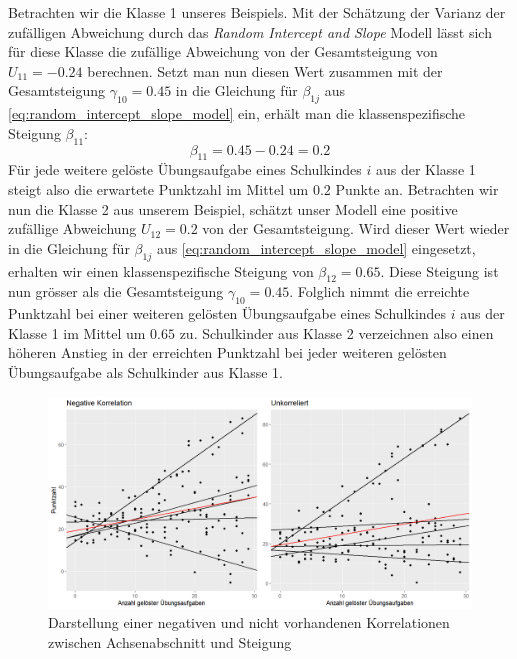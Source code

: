 \documentclass[12pt]{article}\usepackage[]{graphicx}\usepackage[]{color}
\begin{document}
Betrachten wir die Klasse 1 unseres Beispiels. Mit der Schätzung der Varianz der zufälligen Abweichung durch das \textit{Random Intercept and Slope} Modell lässt sich für diese Klasse die zufällige Abweichung von der Gesamtsteigung von $U_{11} = -0.24$ berechnen. Setzt man nun diesen Wert zusammen mit der Gesamtsteigung $\gamma_{10} = 0.45$ in die Gleichung für $\beta_{1j}$ aus \eqref{eq:random_intercept_slope_model} ein, erhält man die klassenspezifische Steigung $\beta_{11}$:
\begin{equation} \label{eq:beta1_example}	
\beta_{11} = 0.45 - 0.24 = 0.2
\end{equation} 
Für jede weitere gelöste Übungsaufgabe eines Schulkindes $i$ aus der Klasse 1 steigt also die erwartete Punktzahl im Mittel um $0.2$ Punkte an. Betrachten wir nun die Klasse 2 aus unserem Beispiel, schätzt unser Modell eine positive zufällige Abweichung $U_{12} = 0.2$ von der Gesamtsteigung. Wird dieser Wert wieder in die Gleichung für $\beta_{1j}$ aus \eqref{eq:random_intercept_slope_model} eingesetzt, erhalten wir einen klassenspezifische Steigung von $\beta_{12} = 0.65$. Diese Steigung ist nun grösser als die Gesamtsteigung $\gamma_{10} = 0.45$. Folglich nimmt die erreichte Punktzahl bei einer weiteren gelösten Übungsaufgabe eines Schulkindes $i$ aus der Klasse 1 im Mittel um $0.65$ zu. Schulkinder aus Klasse 2 verzeichnen also einen höheren Anstieg in der erreichten Punktzahl bei jeder weiteren gelösten Übungsaufgabe als Schulkinder aus Klasse 1. 

\begin{figure}[b!]
\centering
\includegraphics[width = \textwidth]{corr_s_i}
\caption{Darstellung einer negativen und nicht vorhandenen Korrelationen zwischen Achsenabschnitt und Steigung}
\label{fig:corr_s_i}
\end{figure}
\end{document}
